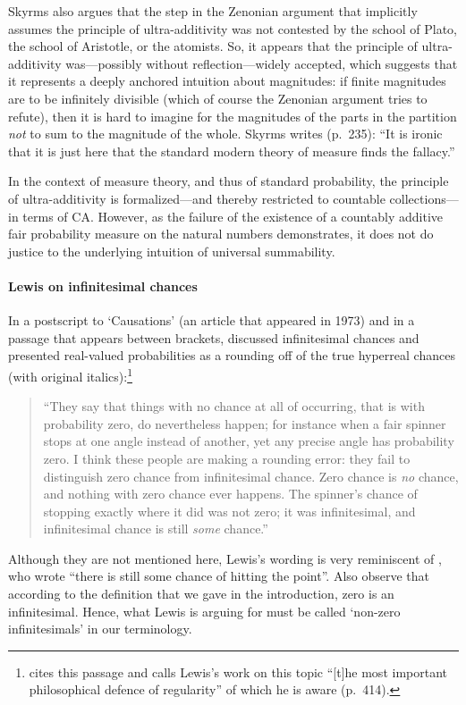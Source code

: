 Skyrms also argues that the step in the Zenonian argument that implicitly assumes the principle of ultra-additivity was not contested by the school of Plato, the school of Aristotle, or the atomists. So, it appears that the principle of ultra-additivity was---possibly without reflection---widely accepted, which suggests that it represents a deeply anchored intuition about magnitudes: if finite magnitudes are to be infinitely divisible (which of course the Zenonian argument tries to refute), then it is hard to imagine for the magnitudes of the parts in the partition \emph{not} to sum to the magnitude of the whole.
Skyrms writes (p.~235): ``It is ironic that it is just here that the standard modern theory of measure finds the fallacy.''

In the context of measure theory, and thus of standard probability, the principle of ultra-additivity is formalized---and thereby restricted to countable collections---in terms of CA. However, as the failure of the existence of a countably additive fair probability measure on the natural numbers demonstrates, it does not do justice to the underlying intuition of universal summability.

\paragraph{Lewis on infinitesimal chances}
In a postscript to `Causations' (an article that appeared in 1973) and in a passage that appears between brackets, \citet[pp.~175--176]{Lewis:1986} discussed infinitesimal chances and presented real-valued probabilities as a rounding off of the true hyperreal chances (with original italics):\footnote{\citet{Hajek:2012a} cites this passage and calls Lewis's work on this topic ``[t]he most important philosophical defence of regularity'' of which he is aware (p.~414).}
\begin{quote}
``They say that things with no chance at all of occurring, that is with probability zero, do nevertheless happen; for instance when a fair spinner stops at one angle instead of another, yet any precise angle has probability zero. I think these people are making a rounding error: they fail to distinguish zero chance from infinitesimal chance. Zero chance is \emph{no} chance, and nothing with zero chance ever happens. The spinner's chance of stopping exactly where it did was not zero; it was infinitesimal, and infinitesimal chance is still \emph{some} chance.''
\end{quote}
Although they are not mentioned here, Lewis's wording is very reminiscent of \citet{BernsteinWattenberg:1969}, who wrote ``there is still some chance of hitting the point''. Also observe that according to the definition that we gave in the introduction, zero is an infinitesimal. Hence, what Lewis is arguing for must be called `non-zero infinitesimals' in our terminology.

